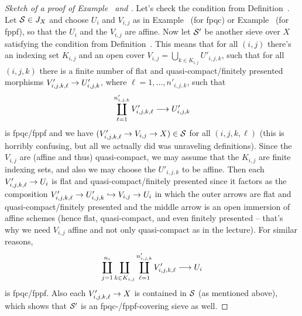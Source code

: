 \documentclass[a4paper,parskip=half,numbers=enddot, DIV=12]{scrreprt}
\begin{document}
\begin{proof}[Sketch of a proof of Example~ and ]
	Let's check the condition from Definition~. Let $\mathcal{S}\in J_X$ and choose $U_i$ and $V_{i,j}$ as in Example~ (for fpqc) or Example~ (for fppf), so that the $U_i$ and the $V_{i,j}$ are affine. Now let $\mathcal{S}'$ be another sieve over $X$ satisfying the condition from Definition~. This means that for all $(i,j)$ there's an indexing set $K_{i,j}$ and an open cover $V_{i,j}=\bigcup_{k\in K_{i,j}}U'_{i,j,k}$, such that for all $(i,j,k)$ there is a finite number of flat and quasi-compact/finitely presented morphisms $V'_{i,j,k,\ell}\morphism U'_{i,j,k}$, where $\ell=1,\ldots,n'_{i,j,k}$, such that
	\begin{align*}
		\coprod_{\ell=1}^{n'_{i,j,k}}V'_{i,j,k,\ell}\morphism U'_{i,j,k}
	\end{align*}
	is fpqc/fppf and we have $(V'_{i,j,k,\ell}\morphism V_{i,j}\morphism X)\in \Ss$ for all $(i,j,k,\ell)$ (this is horribly confusing, but all we actually did was unraveling definitions). Since the $V_{i,j}$ are (affine and thus) quasi-compact, we may assume that the $K_{i,j}$ are finite indexing sets, and also we may choose the $U'_{i,j,k}$ to be affine. Then each $V'_{i,j,k,\ell}\morphism U_i$ is flat and quasi-compact/finitely presented since it factors as the composition $V'_{i,j,k,\ell}\morphism U'_{i,j,k}\monomorphism V_{i,j}\morphism U_i$ in which the outer arrows are flat and quasi-compact/finitely presented and the middle arrow is an open immersion of affine schemes (hence flat, quasi-compact, and even finitely presented -- that's why we need $V_{i,j}$ affine and not only quasi-compact as in the lecture). For similar reasons,
	\begin{align*}
		\coprod_{j=1}^{n_i}\coprod_{k\in K_{i,j}}\coprod_{\ell=1}^{n'_{i,j,k}}V'_{i,j,k,\ell}\morphism U_i
	\end{align*}
	is fpqc/fppf. Also each $V'_{i,j,k,\ell}\morphism X$ is contained in $\mathcal{S}$ (as mentioned above), which shows that $\mathcal{S}'$ is an fpqc-/fppf-covering sieve as well.
	

\end{proof}
\end{document}
